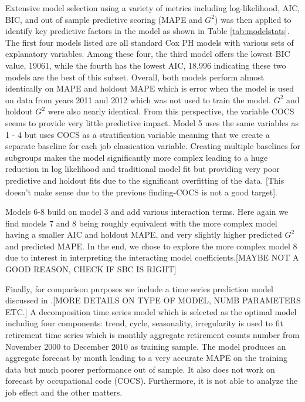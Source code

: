 \documentclass[12pt,letterpaper]{article}
\begin{document}
Extensive model selection using a variety of metrics including log-likelihood, AIC, BIC, and out of sample predictive scoring (MAPE and $G^2$) was then applied to identify key predictive factors in the model as shown in Table \ref{tab:modelstats}. %
The first four models listed are all standard Cox PH models with various sets of explanatory variables.  Among these four, the third model offers the lowest BIC value, 19061, while the fourth has the lowest AIC, 18,996 indicating these two models are the best of this subset.  Overall, both models perform almost identically on MAPE and holdout MAPE which is error when the model is used on data from years 2011 and 2012 which was not used to train the model. $G^2$ and holdout $G^2$ were also nearly identical.  From this perspective, the variable COCS seems to provide very little predictive impact.   Model 5 uses the same variables as 1 - 4 but uses COCS as a stratification variable meaning that we create a separate baseline for each job classication variable.  Creating multiple baselines for subgroups makes the model significantly more complex leading to a huge reduction in log likelihood and traditional model fit but providing very poor predictive and holdout fits due to the significant overfitting of the data. [This doesn't make sense due to the previous finding-COCS is not a good target].

Models 6-8 build on model 3 and add various interaction terms.  Here again we find models 7 and 8 being roughly equivalent with the more complex model having a smaller AIC and holdout MAPE, and very slightly higher predicted $G^2$ and predicted MAPE.  In the end, we chose to explore the more complex model 8 due to interest in interpreting the interacting model coefficients.[MAYBE NOT A GOOD REASON, CHECK IF SBC IS RIGHT]

Finally, for comparison purposes we include a time series prediction model discussed in \cite{zhu2015}.[MORE DETAILS ON TYPE OF MODEL, NUMB PARAMETERS ETC.] A decomposition time series model which is selected as the optimal model including four components: trend, cycle, seasonality, irregularity is used to fit retirement time series which is monthly aggregate retirement counts number from November 2000 to December 2010 as training sample. The model produces an aggregate forecast by month leading to a very accurate MAPE on the training data but much poorer performance out of sample. It also does not work on forecast by occupational code (COCS). Furthermore, it is not able to analyze the job effect and the other matters.
\end{document}
